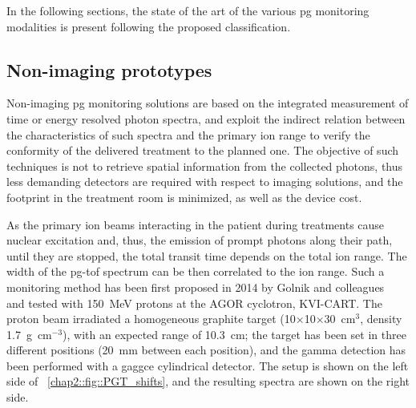 In the following sections, the state of the art of the various \gls{pg} monitoring modalities is present following the proposed classification.

\subsection{Non-imaging prototypes}\label{chap2::subsec::PGdevices_nonImaging}

Non-imaging \gls{pg} monitoring solutions are based on the integrated measurement of time or energy resolved photon spectra, and exploit the indirect relation between the characteristics of such spectra and the primary ion range to verify the conformity of the delivered treatment to the planned one. The objective of such techniques is not to retrieve spatial information from the collected photons, thus less demanding detectors are required with respect to imaging solutions, and the footprint in the treatment room is minimized, as well as the device cost. 

As the primary ion beams interacting in the patient during treatments  cause nuclear excitation and, thus, the emission of prompt photons along their path, until they are stopped, the total transit time depends on the total ion range. The width of the \gls{pg}-\gls{tof} spectrum can be then correlated to the ion range. Such a monitoring method has been first proposed in 2014 by Golnik and colleagues~\parencite{Golnik2014} and tested with 150~MeV protons at the AGOR cyclotron, KVI-CART. The proton beam irradiated a homogeneous graphite target (10$\times$10$\times$30~cm$^3$, density 1.7~g~cm$^{-3}$), with an expected range of 10.3~cm; the target has been set in three different positions (20~mm between each position), and the gamma detection has been performed with a \gls{gaggce} cylindrical detector.  The setup is shown on the left side of \figurename~\ref{chap2::fig::PGT_shifts}, and the resulting spectra are shown  on the right side.

